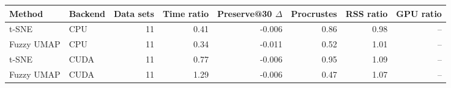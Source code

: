 \begin{tabular}{llrrrrrr}
\toprule
Method & Backend & Data sets & Time ratio & Preserve@30 $\Delta$ & Procrustes & RSS ratio & GPU ratio \\
\midrule
t-SNE & CPU & 11 & 0.41 & -0.006 & 0.86 & 0.98 & -- \\
Fuzzy UMAP & CPU & 11 & 0.34 & -0.011 & 0.52 & 1.01 & -- \\
t-SNE & CUDA & 11 & 0.77 & -0.006 & 0.95 & 1.09 & -- \\
Fuzzy UMAP & CUDA & 11 & 1.29 & -0.006 & 0.47 & 1.07 & -- \\
\bottomrule
\end{tabular}

